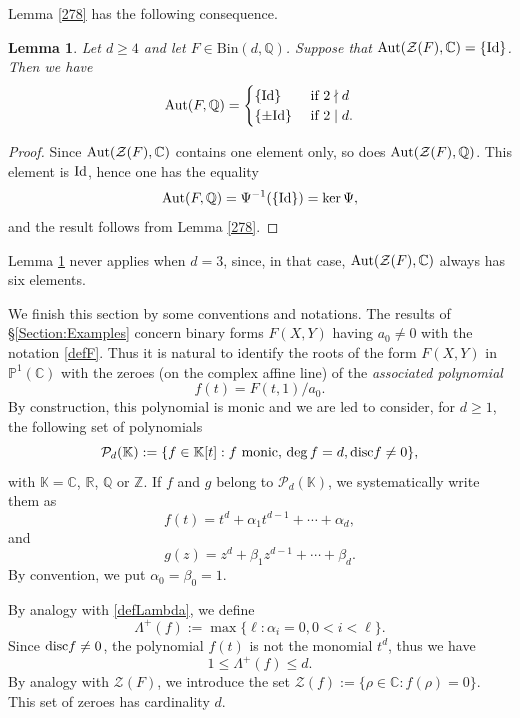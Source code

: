 \documentclass[10pt]{article}
\newtheorem{lemma}[theorem]{Lemma}
\theoremstyle{definition}
\numberwithin{equation}{section}
\newcommand {\Q}{{\mathbb{Q}}}
\newcommand {\C}{{\mathbb{C}}}
\newcommand {\PP}{{\mathbb{P}}}
\newcommand {\R}{{\mathbb{R}}}
\newcommand {\Z}{{\mathbb{Z}}}
\newcommand {\K}{{\mathbb{K}}}
\newcommand{\Bin}{\mathrm {Bin}}
\begin{document}
Lemma \ref{278} has the following consequence.
\begin{lemma}\label{278ter} 
Let $d\geqslant 4$ and let $F\in \Bin  (d, \Q)$. Suppose that 
${\rm Aut }({\mathcal Z}(F), \C) = \{{\rm Id}\}$. Then we have 
\[ 
{\rm Aut}(F, \Q) 
 = \begin{cases} \left\{ {\rm Id}\right\} &\text{ if } 2 \nmid d \\ \left\{ \pm {\rm Id}\right\} &\text{ if } 2 \mid d.
 \end{cases}
\]
\end{lemma}
\begin{proof} Since ${\rm Aut}(\mathcal Z (F), \C)$ contains one element only, so does ${\rm Aut}({\mathcal Z} (F), \Q)$. This element is ${\rm Id}$, hence one has the equality
\[
{\rm Aut} (F, \Q)= \Psi^{-1} (\{{\rm Id}\})= \ker \Psi,
\]
and the result follows from Lemma \ref{278}.
\end{proof}
Lemma \ref{278ter} never applies when $d=3$, since, in that case, ${\rm Aut}(\mathcal Z (F), \C)$ always has six elements.

\medskip 
We finish this section by some conventions and notations. The results of \S \ref{Section:Examples} concern binary forms $F(X,Y)$ having $a_0\neq 0$ with the notation \eqref{defF}. Thus it is natural to identify the roots of the form $F(X,Y)$ in $\PP^1 (\C)$ with the zeroes (on the complex affine line) of the {\em associated polynomial} 
\begin{equation}\label{669}
f(t)= F(t,1)/a_0.
\end{equation}
By construction, this polynomial is monic and we are led to consider, for $d \geqslant 1$, the following set
of polynomials
\begin{equation}\label{defPd(K)}
\mathcal P_d (\K):= \{ f\in \K [t]: f\text{ monic},\, \deg f =d, {\rm disc } f \neq 0 \},
\end{equation}
with $\K= \C$, $\R$, $\Q$ or $\Z$.
If $f$ and $g$ belong to $\mathcal P_d (\K)$, we systematically write them as 
\begin{equation}\label{670*}
f(t) = t^d +\alpha_1 t^{d-1} + \cdots + \alpha_d,
\end{equation}
and 
\begin{equation}\label{670**}
g(z) = z^d +\beta_1 z^{d-1} + \cdots + \beta_d.
\end{equation}
By convention, we put $\alpha_0 = \beta_0 =1$.

By analogy with \eqref{defLambda}, we define 
\begin{equation}\label{deflambdas}
\Lambda^+ (f) := \max\{ \ell : \alpha_i= 0, 0 < i <\ell \}.
\end{equation}
Since ${\rm disc } f \neq 0$, the polynomial $f(t)$ is not the monomial $t^d$, thus we have 
\begin{equation}\label{1leqleqd}
1\leqslant \Lambda^+ (f)\leqslant d.
\end{equation}
 By analogy with $\mathcal Z (F)$, we introduce the set $\mathcal Z (f):= \{ \rho \in \C : f (\rho) =0\}. $ This set of zeroes has cardinality $d$.
 
\end{document}
